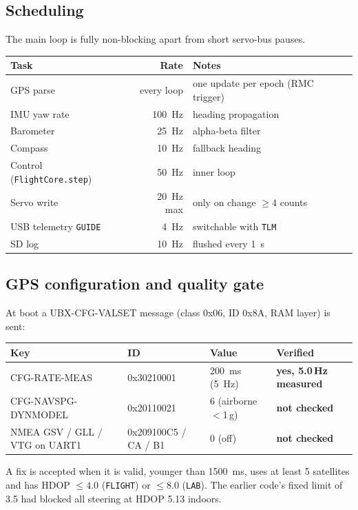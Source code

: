 \documentclass[11pt,a4paper]{article}
\newcommand{\good}[1]{\textcolor{goodgreen}{\textbf{#1}}}
\newcommand{\warn}[1]{\textcolor{warnamber}{\textbf{#1}}}
\newcommand{\code}[1]{\texttt{#1}}
\begin{document}
\subsection{Scheduling}
The main loop is fully non-blocking apart from short servo-bus pauses.
\begin{center}
\small
\begin{tabular}{lrl}
\toprule
\textbf{Task} & \textbf{Rate} & \textbf{Notes} \\
\midrule
GPS parse & every loop & one update per epoch (RMC trigger) \\
IMU yaw rate & \SI{100}{\hertz} & heading propagation \\
Barometer & \SI{25}{\hertz} & alpha-beta filter \\
Compass & \SI{10}{\hertz} & fallback heading \\
Control (\code{FlightCore.step}) & \SI{50}{\hertz} & inner loop \\
Servo write & \SI{20}{\hertz} max & only on change $\ge 4$ counts \\
USB telemetry \code{GUIDE} & \SI{4}{\hertz} & switchable with \code{TLM} \\
SD log & \SI{10}{\hertz} & flushed every \SI{1}{\second} \\
\bottomrule
\end{tabular}
\end{center}

\subsection{GPS configuration and quality gate}
At boot a UBX-CFG-VALSET message (class 0x06, ID 0x8A, RAM layer) is sent:
\begin{center}
\small
\begin{tabular}{llll}
\toprule
\textbf{Key} & \textbf{ID} & \textbf{Value} & \textbf{Verified} \\
\midrule
CFG-RATE-MEAS & 0x30210001 & \SI{200}{\milli\second} (\SI{5}{\hertz}) & \good{yes, 5.0\,Hz measured} \\
CFG-NAVSPG-DYNMODEL & 0x20110021 & 6 (airborne $<$1\,g) & \warn{not checked} \\
NMEA GSV / GLL / VTG on UART1 & 0x209100C5 / CA / B1 & 0 (off) & \warn{not checked} \\
\bottomrule
\end{tabular}
\end{center}
A fix is accepted when it is valid, younger than \SI{1500}{\milli\second},
uses at least 5 satellites and has HDOP $\le 4.0$ (\code{FLIGHT}) or
$\le 8.0$ (\code{LAB}). The earlier code's fixed limit of 3.5 had blocked all
steering at HDOP 5.13 indoors.
\end{document}
